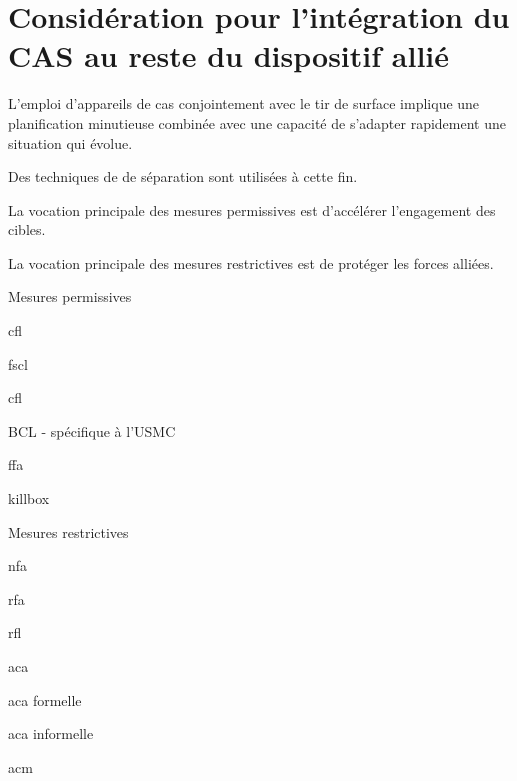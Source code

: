 \section{Considération pour l'intégration du CAS au reste du dispositif allié}

L'emploi d'appareils de \gls{cas} conjointement avec le tir de surface implique une planification minutieuse combinée avec une capacité de s'adapter rapidement une situation qui évolue.

Des techniques de de séparation sont utilisées à cette fin.

\begin{e1}
	\item La vocation principale des mesures permissives est d'accélérer l'engagement des cibles.
	\item La vocation principale des mesures restrictives est de protéger les forces alliées.
	\begin{e2}
		\item Mesures permissives
		\begin{e3}
			\item \acrfull{cfl}
			\item \acrfull{fscl}
			\item \acrfull{cfl}
			\item BCL - spécifique à l'USMC
			\item \acrfull{ffa}
			\item \acrfull{killbox}
		\end{e3}
		\item Mesures restrictives
		\begin{e3}
			\item \acrfull{nfa}
			\item \acrfull{rfa}
			\item \acrfull{rfl}
			\item \acrfull{aca}
			\begin{e4}
				\item \gls{aca} formelle
				\item \gls{aca} informelle
			\end{e4}
		\end{e3}
		\item \acrfull{acm}	

\end{e2}
\end{e1}
